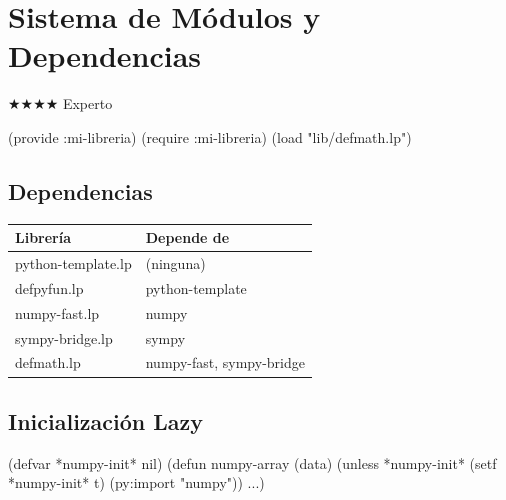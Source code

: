 \chapter{Sistema de Módulos y Dependencias}
\label{chap:module-system}
{\huge$\bigstar$}{\huge$\bigstar$}{\huge$\bigstar$}{\huge$\bigstar$} Experto

\begin{lispcode}
(provide :mi-libreria)
(require :mi-libreria)
(load "lib/defmath.lp")
\end{lispcode}

\section{Dependencias}
\begin{center}
\begin{tabular}{ll}
\toprule
Librería & Depende de \\
\midrule
python-template.lp & (ninguna) \\
defpyfun.lp & python-template \\
numpy-fast.lp & numpy \\
sympy-bridge.lp & sympy \\
defmath.lp & numpy-fast, sympy-bridge \\
\bottomrule
\end{tabular}
\end{center}

\section{Inicialización Lazy}
\begin{lispcode}
(defvar *numpy-init* nil)
(defun numpy-array (data)
  (unless *numpy-init* (setf *numpy-init* t) (py:import "numpy"))
  ...)
\end{lispcode}

